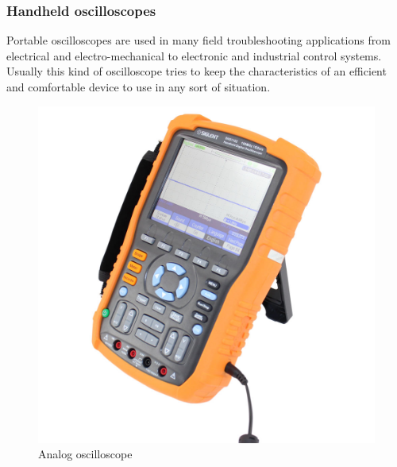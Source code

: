 \documentclass[letterpaper]{article}
\begin{document}
\subsubsection*{Handheld oscilloscopes}
Portable oscilloscopes are used in many field troubleshooting applications from electrical and electro-mechanical to electronic and industrial control systems. Usually this kind of oscilloscope tries to keep the characteristics of an efficient and comfortable device to use in any sort of situation.
\begin{figure}[H]
    \centering
    \includegraphics[width=.4\linewidth]{img/intro/hand_os}
    \caption{Analog oscilloscope}
\end{figure}
\end{document}
